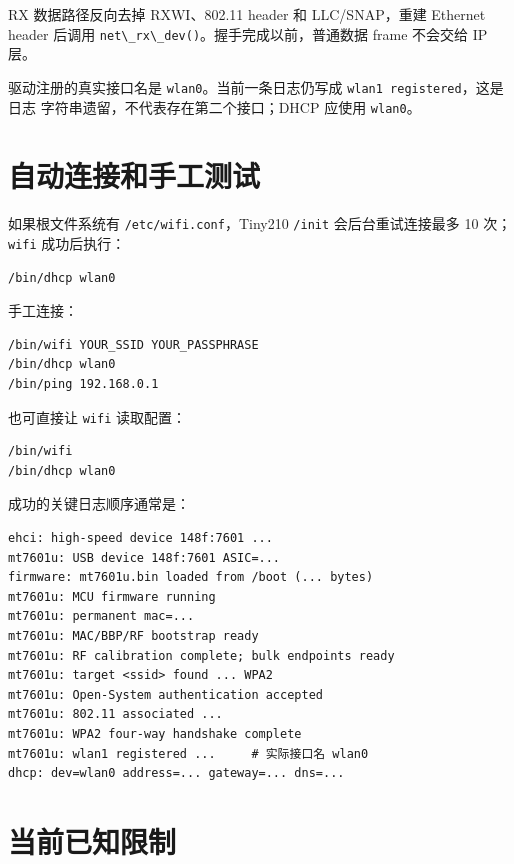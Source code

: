 RX 数据路径反向去掉 RXWI、802.11 header 和 LLC/SNAP，重建 Ethernet
header 后调用
\passthrough{\lstinline!net\_rx\_dev()!}。握手完成以前，普通数据 frame
不会交给 IP 层。

驱动注册的真实接口名是
\passthrough{\lstinline!wlan0!}。当前一条日志仍写成
\passthrough{\lstinline!wlan1 registered!}，这是日志
字符串遗留，不代表存在第二个接口；DHCP 应使用
\passthrough{\lstinline!wlan0!}。

\section{自动连接和手工测试}\label{ux81eaux52a8ux8fdeux63a5ux548cux624bux5de5ux6d4bux8bd5}

如果根文件系统有 \passthrough{\lstinline!/etc/wifi.conf!}，Tiny210
\passthrough{\lstinline!/init!} 会后台重试连接最多 10 次；
\passthrough{\lstinline!wifi!} 成功后执行：

\begin{lstlisting}[language=sh]
/bin/dhcp wlan0
\end{lstlisting}

手工连接：

\begin{lstlisting}[language=sh]
/bin/wifi YOUR_SSID YOUR_PASSPHRASE
/bin/dhcp wlan0
/bin/ping 192.168.0.1
\end{lstlisting}

也可直接让 \passthrough{\lstinline!wifi!} 读取配置：

\begin{lstlisting}[language=sh]
/bin/wifi
/bin/dhcp wlan0
\end{lstlisting}

成功的关键日志顺序通常是：

\begin{lstlisting}
ehci: high-speed device 148f:7601 ...
mt7601u: USB device 148f:7601 ASIC=...
firmware: mt7601u.bin loaded from /boot (... bytes)
mt7601u: MCU firmware running
mt7601u: permanent mac=...
mt7601u: MAC/BBP/RF bootstrap ready
mt7601u: RF calibration complete; bulk endpoints ready
mt7601u: target <ssid> found ... WPA2
mt7601u: Open-System authentication accepted
mt7601u: 802.11 associated ...
mt7601u: WPA2 four-way handshake complete
mt7601u: wlan1 registered ...     # 实际接口名 wlan0
dhcp: dev=wlan0 address=... gateway=... dns=...
\end{lstlisting}

\section{当前已知限制}\label{ux5f53ux524dux5df2ux77e5ux9650ux5236}

